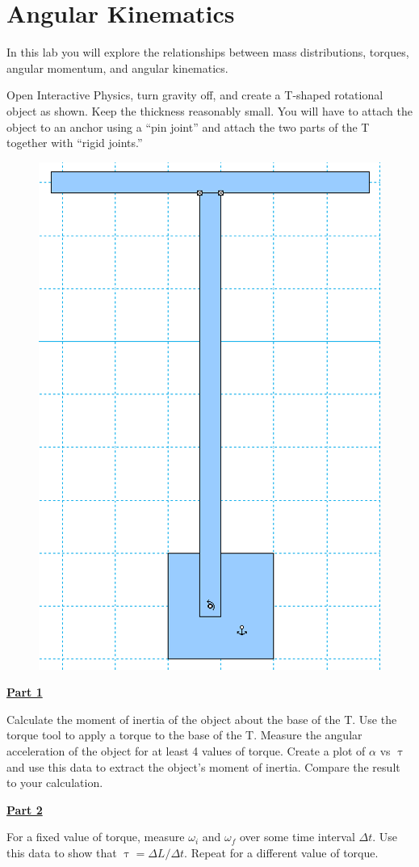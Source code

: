 \section{Angular Kinematics}

In this lab you will explore the relationships between mass distributions, torques, angular momentum, and angular kinematics.
\hfill \break

Open Interactive Physics, turn gravity off, and create a T-shaped rotational object as shown.
Keep the thickness reasonably small.
You will have to attach the object to an anchor using a ``pin joint'' and attach the two parts of the T together with ``rigid joints.''
%
\begin{figure}[H]
\includegraphics[scale=0.70]{figures/angularKinematics/figure1.png}
\end{figure}
%

\underline{\textbf{Part 1}} \par
Calculate the moment of inertia of the object about the base of the T.
Use the torque tool to apply a torque to the base of the T.
Measure the angular acceleration of the object for at least 4 values of torque.
Create a plot of $\alpha$ vs $\uptau$ and use this data to extract the object's moment of inertia.
Compare the result to your calculation.
\hfill \break

\underline{\textbf{Part 2}} \par
For a fixed value of torque, measure $\omega_i$ and $\omega_f$ over some time interval $\Delta t$.
Use this data to show that $\uptau = \Delta L / \Delta t$.
Repeat for a different value of torque.

\pagebreak \clearpage
